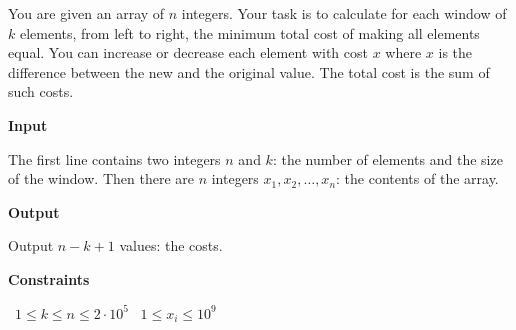 You are given an array of $n$ integers. Your task is to calculate for each window of $k$ elements, from left to right, the minimum total cost of making all elements equal.
You can increase or decrease each element with cost $x$ where $x$ is the difference between the new and the original value. The total cost is the sum of such costs.

\vspace{0.3cm}\noindent\textbf{Input}

The first line contains two integers $n$ and $k$: the number of elements and the size of the window.
Then there are $n$ integers $x_1,x_2,\ldots,x_n$: the contents of the array.

\vspace{0.3cm}\noindent\textbf{Output}

Output $n-k+1$ values: the costs.

\vspace{0.3cm}\noindent\textbf{Constraints}

\textbullet\ $1 \le k \le n \le 2 \cdot 10^5$
\textbullet\ $1 \le x_i \le 10^9$